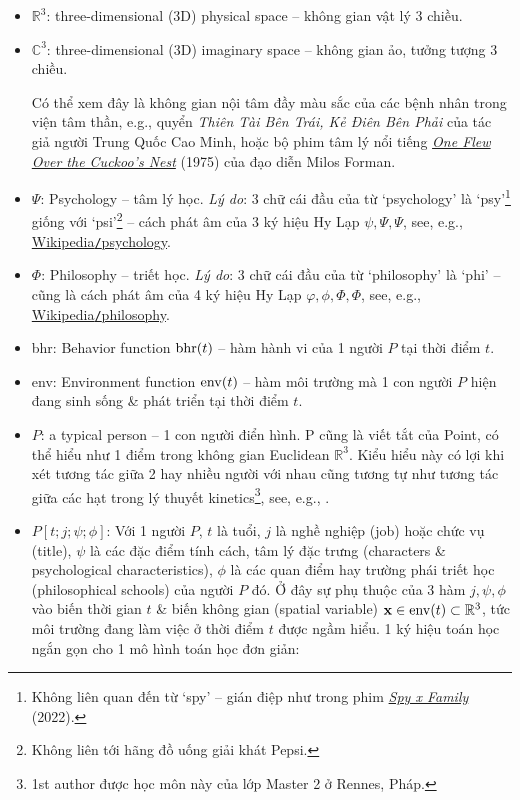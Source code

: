 \documentclass[12pt]{article}
\begin{document}
\begin{itemize}
	\item $\mathbb{R}^3$: three-dimensional (3D) physical space -- không gian vật lý 3 chiều.
	\item $\mathbb{C}^3$: three-dimensional (3D) imaginary space -- không gian ảo, tưởng tượng 3 chiều.
	
	Có thể xem đây là không gian nội tâm đầy màu sắc của các bệnh nhân trong viện tâm thần, e.g., quyển {\it Thiên Tài Bên Trái, Kẻ Điên Bên Phải} của tác giả người Trung Quốc {\sc Cao Minh}, hoặc bộ phim tâm lý nổi tiếng \href{https://www.imdb.com/title/tt0073486}{\it One Flew Over the Cuckoo's Nest} (1975) của đạo diễn {\sc Milos Forman}.
	\item $\Psi$: Psychology -- tâm lý học. {\it Lý do}: 3 chữ cái đầu của từ `psychology' là `psy'\footnote{Không liên quan đến từ `spy' -- gián điệp như trong phim \href{https://www.imdb.com/title/tt13706018}{\it Spy x Family} (2022).} giống với `psi'\footnote{Không liên tới hãng đồ uống giải khát Pepsi.} -- cách phát âm của 3 ký hiệu Hy Lạp $\psi,\Psi,\varPsi$, see, e.g., \href{https://en.wikipedia.org/wiki/Psychology}{Wikipedia{\tt/}psychology}.
	\item $\Phi$: Philosophy -- triết học. {\it Lý do}: 3 chữ cái đầu của từ `philosophy' là `phi' -- cũng là cách phát âm của 4 ký hiệu Hy Lạp $\varphi,\phi,\Phi,\varPhi$, see, e.g., \href{https://en.wikipedia.org/wiki/Philosophy}{Wikipedia{\tt/}philosophy}.
	\item bhr: Behavior function ${\rm bhr}(t)$ -- hàm hành vi của 1 người $P$ tại thời điểm $t$.
	\item env: Environment function ${\rm env}(t)$ -- hàm môi trường mà 1 con người $P$ hiện đang sinh sống \& phát triển tại thời điểm $t$.
	\item $P$: a typical person -- 1 con người điển hình. P cũng là viết tắt của Point, có thể hiểu như 1 điểm trong không gian Euclidean $\mathbb{R}^3$. Kiểu hiểu này có lợi khi xét tương tác giữa 2 hay nhiều người với nhau cũng tương tự như tương tác giữa các hạt trong lý thuyết kinetics\footnote{1st author được học môn này của lớp Master 2 ở Rennes, Pháp.}, see, e.g., \cite{Tartar2008}.
	\item $P[t;j;\psi;\phi]$: Với 1 người $P$, $t$ là tuổi, $j$ là nghề nghiệp (job) hoặc chức vụ (title), $\psi$ là các đặc điểm tính cách, tâm lý đặc trưng (characters \& psychological characteristics), $\phi$ là các quan điểm hay trường phái triết học (philosophical schools) của người $P$ đó. Ở đây sự phụ thuộc của 3 hàm $j,\psi,\phi$ vào biến thời gian $t$ \& biến không gian (spatial variable) ${\bf x}\in{\rm env}(t)\subset\mathbb{R}^3$, tức môi trường đang làm việc ở thời điểm $t$ được ngầm hiểu. 1 ký hiệu toán học ngắn gọn cho 1 mô hình toán học đơn giản:

\end{itemize}
\end{document}
